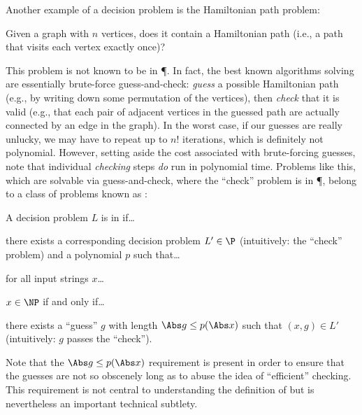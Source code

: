 Another example of a decision problem is the Hamiltonian path problem:
\begin{definition}%
  \label{def:hamiltonian-path} Given a graph with \(n\) vertices, does it
  contain a Hamiltonian path (i.e., a path that visits each vertex exactly
  once)?
\end{definition}
This problem is not known to be in \P.  In fact, the best known algorithms
solving  are essentially brute-force guess-and-check:
\emph{guess} a possible Hamiltonian path (e.g., by writing down some
permutation of the vertices), then \emph{check} that it is valid (e.g., that
each pair of adjacent vertices in the guessed path are actually connected by an
edge in the graph).  In the worst case, if our guesses are really unlucky, we
may have to repeat up to \(n!\) iterations, which is definitely not polynomial.
However, setting aside the cost associated with brute-forcing guesses, note
that individual \emph{checking} steps \emph{do} run in polynomial time.
Problems like this, which are solvable via guess-and-check, where the ``check''
problem is in \P, belong to a class of problems known as \NP:
\begin{definition}[\NP]%
  \label{def:np} A decision problem \(L\) is in \NP{} if\dots
  \begin{nested}
    there exists a corresponding decision problem \(L'\in\P\) (intuitively: the
    ``check'' problem) and a polynomial \(p\) such that\dots
    \begin{nested}
      for all input strings \(x\)\dots
      \begin{nested}
        \(x \in \NP\) if and only if\dots
        \begin{nested}
          there exists a ``guess'' \(g\) with length \(\Abs g \le p(\Abs x)\)
          such that \((x, g) \in L'\) (intuitively: \(g\) passes the
          ``check'').
        \end{nested}
      \end{nested}
    \end{nested}
  \end{nested}

  Note that the \(\Abs g \le p(\Abs x)\) requirement is present in order to
  ensure that the guesses are not so obscenely long as to abuse the idea of
  ``efficient'' checking.  This requirement is not central to understanding the
  definition of \NP{} but is nevertheless an important technical subtlety.
\end{definition}

